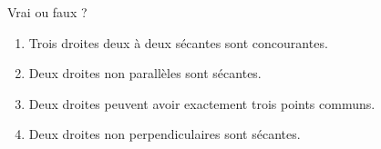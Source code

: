 \begin{exercice}
    Vrai ou faux ?
    \begin{enumerate}
       \item Trois droites deux à deux  sécantes sont concourantes.
       \item Deux droites non parallèles sont sécantes.
       \item Deux droites peuvent avoir exactement trois points communs.
       \item Deux droites non perpendiculaires sont sécantes.
    \end{enumerate}
 \end{exercice}